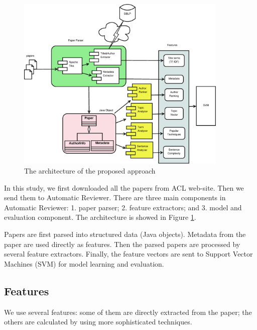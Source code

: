 \documentclass[11pt,letterpaper]{article}
\begin{document}
\begin{figure}[htb]
  \centering
	 	 \includegraphics[width=0.9\textwidth]{materials/architecture.eps}
		\caption{The architecture of the proposed approach}
		\label{fig:architecture}
\end{figure}
In this study, we first downloaded all the papers from ACL web-site. Then we send them to Automatic Reviewer. There are three main components in Automatic Reviewer: 1. paper parser; 2. feature extractors; and 3. model and evaluation component. 
The architecture is showed in Figure \ref{fig:architecture}.

Papers are first parsed into structured data (Java objects). Metadata from the paper are used directly as features. Then the parsed papers are processed by several feature extractors. Finally, the feature vectors are sent to Support Vector Machines (SVM) for model learning and evaluation.




\subsection{Features}
We use several features: some of them are directly extracted from the paper; 
the others are calculated by using more sophisticated techniques.
\end{document}
